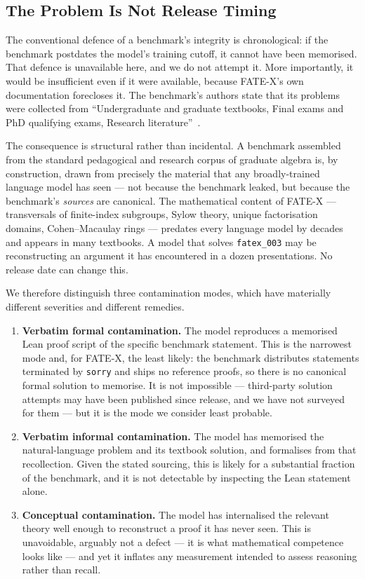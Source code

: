 \documentclass[12pt, a4paper]{article}
\begin{document}
\subsection{The Problem Is Not Release Timing}

The conventional defence of a benchmark's integrity is chronological: if the
benchmark postdates the model's training cutoff, it cannot have been
memorised. That defence is unavailable here, and we do not attempt it. More
importantly, it would be insufficient even if it were available, because
FATE-X's own documentation forecloses it. The benchmark's authors state
that its problems were collected from ``Undergraduate and graduate
textbooks, Final exams and PhD qualifying exams, Research
literature''~\cite{fatex2025}.

The consequence is structural rather than incidental. A benchmark assembled
from the standard pedagogical and research corpus of graduate algebra is,
by construction, drawn from precisely the material that any broadly-trained
language model has seen --- not because the benchmark leaked, but because
the benchmark's \emph{sources} are canonical. The mathematical content of
FATE-X --- transversals of finite-index subgroups, Sylow theory, unique
factorisation domains, Cohen--Macaulay rings --- predates every language
model by decades and appears in many textbooks. A model that solves
\texttt{fatex\_003} may be reconstructing an argument it has encountered in
a dozen presentations. No release date can change this.

We therefore distinguish three contamination modes, which have materially
different severities and different remedies.

\begin{enumerate}[leftmargin=*]
  \item \textbf{Verbatim formal contamination.} The model reproduces a
    memorised Lean proof script of the specific benchmark statement. This is
    the narrowest mode and, for FATE-X, the least likely: the benchmark
    distributes statements terminated by \texttt{sorry} and ships no
    reference proofs, so there is no canonical formal solution to memorise.
    It is not impossible --- third-party solution attempts may have been
    published since release, and we have not surveyed for them --- but it is
    the mode we consider least probable.
  \item \textbf{Verbatim informal contamination.} The model has memorised
    the natural-language problem and its textbook solution, and formalises
    from that recollection. Given the stated sourcing, this is likely for a
    substantial fraction of the benchmark, and it is not detectable by
    inspecting the Lean statement alone.
  \item \textbf{Conceptual contamination.} The model has internalised the
    relevant theory well enough to reconstruct a proof it has never seen.
    This is unavoidable, arguably not a defect --- it is what mathematical
    competence looks like --- and yet it inflates any measurement intended
    to assess reasoning rather than recall.
\end{enumerate}
\end{document}
